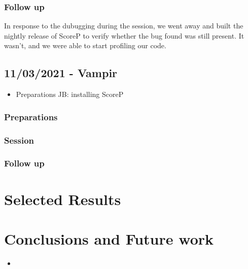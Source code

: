 \documentclass[a4paper,11pt]{article}
\newenvironment{jacknotes}{\color{red}\renewcommand{\labelitemi}{$\star$}\begin{itemize}}{\end{itemize}}
\begin{document}
\subsubsection*{Follow up}
In response to the dubugging during the session, we went away and built the nightly release of ScoreP to verify whether the bug found was still present.
It wasn't, and we were able to start profiling our code.

\clearpage
\subsection{11/03/2021 - Vampir}
\label{ssec:vampir}
\begin{jacknotes}
	\item Preparations JB: installing ScoreP
\end{jacknotes}
\subsubsection*{Preparations}

\subsubsection*{Session}

\subsubsection*{Follow up}

\clearpage
\section{Selected Results}
\label{sec:results}


\clearpage
\section{Conclusions and Future work}
\label{sec:conc}

\begin{itemize}
	\item 
\end{itemize}

\clearpage
\end{document}
